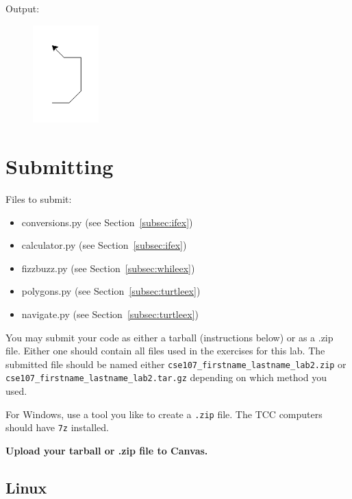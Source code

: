 \documentclass[11pt]{cselabheader}
\begin{document}
\begin{description}
    Output:
  \begin{figure}[!ht]
    \centering
    \vspace{-5mm}
    \includegraphics[width=1.0in]{img/navigate}
    \vspace{-10mm}
  \end{figure}
\end{description}

\pagebreak

\section{Submitting}

Files to submit:
\begin{itemize}
  \item conversions.py (see Section~\ref{subsec:ifex})
  \item calculator.py (see Section~\ref{subsec:ifex})
  \item fizzbuzz.py (see Section~\ref{subsec:whileex})
  \item polygons.py (see Section~\ref{subsec:turtleex})
  \item navigate.py (see Section~\ref{subsec:turtleex})
\end{itemize}

You may submit your code as either a tarball (instructions below) or as a .zip
file. Either one should contain all files used in the exercises for this lab.
The submitted file should be named either
\texttt{cse107\_firstname\_lastname\_lab2.zip} or
\texttt{cse107\_firstname\_lastname\_lab2.tar.gz} depending on which method you
used.

For Windows, use a tool you like to create a \texttt{.zip} file. The TCC computers should
have \texttt{7z} installed.

\begin{center}
  \textbf{Upload your tarball or .zip file to Canvas.}
\end{center}

\subsection{Linux}
\end{document}
